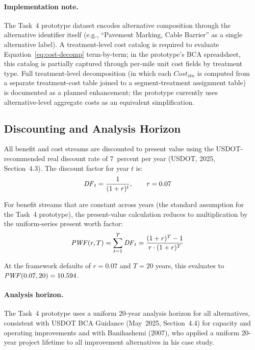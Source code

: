 \paragraph{Implementation note.} The Task~4 prototype dataset encodes
alternative composition through the alternative identifier itself
(e.g., ``Pavement Marking, Cable Barrier'' as a single alternative label).
A treatment-level cost catalog is required to evaluate
Equation~\ref{eq:cost-decomp} term-by-term; in the prototype's BCA
spreadsheet, this catalog is partially captured through per-mile unit cost
fields by treatment type. Full treatment-level decomposition (in which
each $\mathit{Cost}_{ikn}$ is computed from a separate treatment-cost table
joined to a segment-treatment assignment table) is documented as a planned
enhancement; the prototype currently uses alternative-level aggregate
costs as an equivalent simplification.

\subsection{Discounting and Analysis Horizon}
\label{sec:discounting}

All benefit and cost streams are discounted to present value using the
USDOT-recommended real discount rate of 7~percent per year (USDOT, 2025,
Section~4.3). The discount factor for year $t$ is:
\begin{equation}
\mathit{DF}_t = \frac{1}{(1 + r)^t}, \qquad r = 0.07
\label{eq:df}
\end{equation}

For benefit streams that are constant across years (the standard assumption for
the Task~4 prototype), the present-value calculation reduces to multiplication
by the uniform-series present worth factor:
\begin{equation}
\mathit{PWF}(r, T) = \sum_{t=1}^{T} \mathit{DF}_t = \frac{(1+r)^T - 1}{r \cdot (1+r)^T}
\label{eq:pwf}
\end{equation}

\noindent At the framework defaults of $r = 0.07$ and $T = 20$ years, this
evaluates to $\mathit{PWF}(0.07, 20) = 10.594$.

\paragraph{Analysis horizon.} The Task~4 prototype uses a uniform 20-year
analysis horizon for all alternatives, consistent with USDOT BCA Guidance
(May~2025, Section~4.4) for capacity and operating improvements and with
Banihashemi (2007), who applied a uniform 20-year project lifetime to all
improvement alternatives in his case study.

